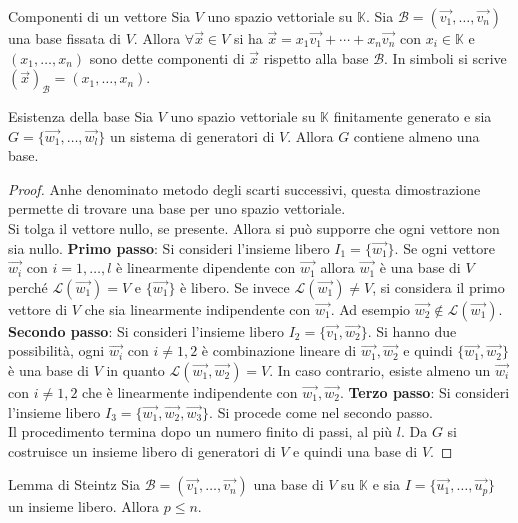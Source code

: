 \begin{Def}{Componenti di un vettore}
  Sia $V$ uno spazio vettoriale su $\mathbb{K}$. Sia $\mathscr{B}=(\vec{v_1},\ldots,
  \vec{v_n})$ una base fissata di $V$. Allora $\forall \vec{x}\in V$ si ha
  $\vec{x}=x_1\vec{v_1}+\cdots+x_n\vec{v_n}$ con $x_i\in\mathbb{K}$ e $(x_1,\ldots,x_n)$
  sono dette componenti di $\vec{x}$ rispetto alla base $\mathscr{B}$. In simboli si
  scrive ${(\vec{x})}_\mathscr{B}=(x_1,\ldots,x_n)$.
\end{Def}

\begin{Thm}{Esistenza della base}
  Sia $V$ uno spazio vettoriale su $\mathbb{K}$ finitamente generato e sia
  $G=\{\vec{w_1},\ldots,\vec{w_l}\}$ un sistema di generatori di $V$. Allora $G$
  contiene almeno una base.
\end{Thm}

\begin{proof}
  Anhe denominato metodo degli scarti successivi, questa dimostrazione permette di
  trovare una base per uno spazio vettoriale.\\
  Si tolga il vettore nullo, se presente. Allora si può supporre che ogni vettore non
  sia nullo. \textbf{Primo passo}: Si consideri l'insieme libero $I_1=\{\vec{w_1}\}$. Se
  ogni vettore $\vec{w_i}$ con $i=1,\ldots,l$ è linearmente dipendente con $\vec{w_1}$
  allora $\vec{w_1}$ è una base di $V$ perché $\mathscr{L}(\vec{w_1})=V$ e $\{\vec{w_1}\}$
  è libero. Se invece $\mathscr{L}(\vec{w_1})\neq V$, si considera il primo vettore di
  $V$ che sia linearmente indipendente con $\vec{w_1}$. Ad esempio
  $\vec{w_2}\notin\mathscr{L}(\vec{w_1})$. \textbf{Secondo passo}: Si consideri
  l'insieme libero $I_2=\{\vec{v_1},\vec{w_2}\}$. Si hanno due possibilità, ogni
  $\vec{w_i}$ con $i\neq1,2$ è combinazione lineare di $\vec{w_1},\vec{w_2}$ e quindi
  $\{\vec{w_1},\vec{w_2}\}$ è una base di $V$ in quanto
  $\mathscr{L}(\vec{w_1},\vec{w_2})=V$. In caso contrario, esiste almeno un $\vec{w_i}$
  con $i\neq1,2$ che è linearmente indipendente con $\vec{w_1},\vec{w_2}$. \textbf{Terzo
  passo}: Si consideri l'insieme libero $I_3=\{\vec{w_1},\vec{w_2},\vec{w_3}\}$. Si
  procede come nel secondo passo.\\
  Il procedimento termina dopo un numero finito di passi, al più $l$. Da $G$ si
  costruisce un insieme libero di generatori di $V$ e quindi una base di $V$.
\end{proof}

\begin{Thm}{Lemma di Steintz}
  Sia $\mathscr{B}=(\vec{v_1},\ldots,\vec{v_n})$ una base di $V$ su $\mathbb{K}$ e sia
  $I=\{\vec{u_1},\ldots,\vec{u_p}\}$ un insieme libero.  Allora $p\leq n$.
\end{Thm}

